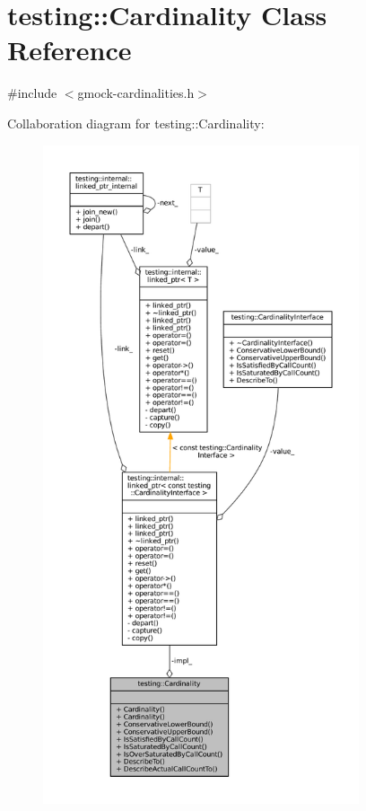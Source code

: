 \hypertarget{classtesting_1_1Cardinality}{}\section{testing\+:\+:Cardinality Class Reference}
\label{classtesting_1_1Cardinality}


{\ttfamily \#include $<$gmock-\/cardinalities.\+h$>$}



Collaboration diagram for testing\+:\+:Cardinality\+:
\nopagebreak
\begin{figure}[H]
\begin{center}
\leavevmode
\includegraphics[height=550pt]{classtesting_1_1Cardinality__coll__graph}
\end{center}
\end{figure}
